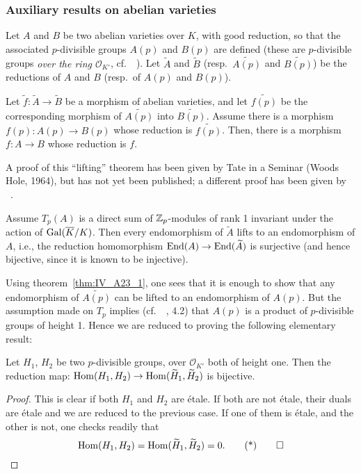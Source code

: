 \begin{subappendices}
\subsubsection{Auxiliary results on abelian varieties}
\label{sec:IV_A23}
Let $A$ and $B$ be two abelian varieties over $K$,
\dpage
with good reduction, so that the associated $p$-divisible groups $A(p)$ and
$B(p)$ are defined (these are $p$-divisible groups \emph{over the ring
$\mathcal{O}_{K'}$}, cf.\ \citeauthor{39}~\cite{39}). Let $\widetilde{A}$ and
$\widetilde{B}$ (resp.\ $\widetilde{A(p)}$ and $\widetilde{B(p)}$) be the
reductions of $A$ and $B$ (resp.\ of $A(p)$ and $B(p)$).

\begin{thm}\label{thm:IV_A23_1}
	Let $\tilde f \colon \widetilde A \to \widetilde B$ be a morphism of
	abelian varieties, and let $\widetilde{f(p)}$ be the corresponding
	morphism of $\widetilde{A(p)}$ into $\widetilde{B(p)}$.  Assume there
	is a morphism $f(p) \colon A(p) \to B(p)$ whose reduction is
	$\widetilde{f(p)}$. Then, there is a morphism $f \colon A \to B$ whose
	reduction is $f$.
\end{thm}
A proof of this ``lifting'' theorem has been given by Tate in a Seminar (Woods
Hole, 1964), but has not yet been published;
%
a different proof has been given by \citeauthor{messing:crystals}~\cite{messing:crystals}.

\begin{thm}\label{thm:IV_A23_2}
	Assume $T_p(A)$ is a direct sum of $\mathbb{Z}_p$-modules of rank 1 invariant
	under the action of $\operatorname{Gal}(\overline{K}/K)$. Then every endomorphism of
	$\widetilde{A}$ lifts to an endomorphism of $A$, i.e., the reduction
	homomorphism $\operatorname{End}(A) \to \operatorname{End}(\widetilde A)$ is surjective (and hence
	bijective, since it is known to be injective).
\end{thm}
Using theorem~\ref{thm:IV_A23_1}, one sees that it is enough to show that any
endomorphism of $\widetilde{A(p)}$ can be lifted to an endomorphism of $A(p)$.
But the assumption made on $T_p$ implies (cf.\ \citeauthor{39}~\cite{39}, 4.2)
that $A(p)$ is a product of $p$-divisible groups of height 1. Hence we are
reduced to proving the following elementary result:

\begin{lem}
	Let $H_1$, $H_2$ be two $p$-divisible groups, over $\mathcal{O}_{K'}$
	both of height one. Then the reduction map: $\operatorname{Hom}(H_1, H_2) \to
	\operatorname{Hom}(\widetilde{H}_1, \widetilde{H}_2)$ is bijective.
\end{lem}
\begin{proof}
	This is clear if both $H_1$ and $H_2$ are étale.
	\dpage
	If both are not étale, their duals are étale and we are reduced to the
	previous case.  If one of them is étale, and the other is not, one
	checks readily that
	\begin{equation}
		\Hom(H_1, H_2) = \Hom(\widetilde{H}_1, \widetilde{H}_2) = 0.
		\tqedhere
	\end{equation}
\end{proof}


\end{subappendices}
